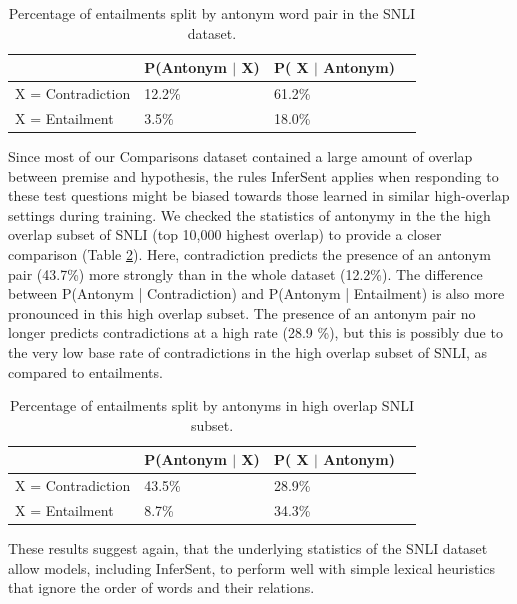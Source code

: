 \begin{table}[htb]
 \centering
   \begin{tabular}{llll}
  \toprule
    & P(Antonym $|$ X) & P( X $|$ Antonym) \\
    \midrule
    X = Contradiction & 12.2\% & 61.2\% \\
      X = Entailment &  3.5\% &  18.0\% \\
\bottomrule 
  \end{tabular}
 \caption{ Percentage of entailments split by antonym word pair in the SNLI dataset. 
}
  \label{tab:antonyms}
\end{table}

Since most of our Comparisons dataset contained a large amount of overlap between premise and hypothesis, the rules InferSent applies when responding to these test questions might be biased towards those learned in similar high-overlap settings during training. We checked the statistics of antonymy in the the high overlap subset of SNLI (top 10,000 highest overlap) to provide a closer comparison (Table \ref{tab:antonyms-ho}). Here, contradiction predicts the presence of an antonym pair (43.7\%) more strongly than in the whole dataset (12.2\%). The difference between P(Antonym | Contradiction) and P(Antonym | Entailment) is also more pronounced in this high overlap subset. The presence of an antonym pair no longer predicts contradictions at a high rate (28.9 \%), but this is possibly due to the very low base rate of contradictions in the high overlap subset of SNLI, as compared to entailments.
 
\begin{table}[htb]
  \centering
  \begin{tabular}{llll}
  \toprule
    & P(Antonym $|$ X) & P( X $|$ Antonym) \\
    \midrule
    X = Contradiction & 43.5\% & 28.9\% \\
      X = Entailment &  8.7\% &  34.3\% \\
\bottomrule 
  \end{tabular}
 \caption{ Percentage of entailments split by antonyms in high overlap SNLI subset.}
  \label{tab:antonyms-ho}
\end{table}
 
These results suggest again, that the underlying statistics of the SNLI dataset allow models, including InferSent, to perform well with simple lexical heuristics that ignore the order of words and their relations.


